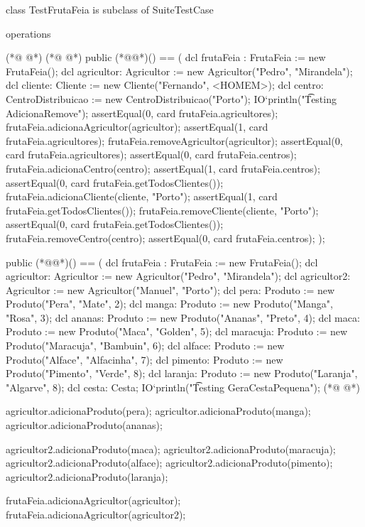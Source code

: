 \begin{vdmpp}[breaklines=true]
class TestFrutaFeia is subclass of SuiteTestCase

operations 

(*@
\label{testGeraCestaPequena:5}
@*)
(*@
\label{testAdicionaRemove:5}
@*)
public (*@@*)() == (
 dcl frutaFeia : FrutaFeia := new FrutaFeia(); 
 dcl agricultor: Agricultor := new Agricultor("Pedro", "Mirandela");
 dcl cliente: Cliente := new Cliente("Fernando", <HOMEM>);
 dcl centro: CentroDistribuicao := new CentroDistribuicao("Porto");
 IO`println("\t Testing AdicionaRemove");
 assertEqual(0, card frutaFeia.agricultores);  
 frutaFeia.adicionaAgricultor(agricultor);
 assertEqual(1, card frutaFeia.agricultores);
 frutaFeia.removeAgricultor(agricultor);
 assertEqual(0, card frutaFeia.agricultores);
 assertEqual(0, card frutaFeia.centros);
 frutaFeia.adicionaCentro(centro);
 assertEqual(1, card frutaFeia.centros);
 assertEqual(0, card frutaFeia.getTodosClientes());
 frutaFeia.adicionaCliente(cliente, "Porto");
 assertEqual(1, card frutaFeia.getTodosClientes());
 frutaFeia.removeCliente(cliente, "Porto");
 assertEqual(0, card frutaFeia.getTodosClientes());
 frutaFeia.removeCentro(centro);
 assertEqual(0, card frutaFeia.centros);
);

public (*@@*)() == (
 dcl frutaFeia : FrutaFeia := new FrutaFeia(); 
 dcl agricultor: Agricultor := new Agricultor("Pedro", "Mirandela"); 
 dcl agricultor2: Agricultor := new Agricultor("Manuel", "Porto"); 
 dcl pera: Produto := new Produto("Pera", "Mate", 2);
 dcl manga: Produto := new Produto("Manga", "Rosa", 3);
 dcl ananas: Produto := new Produto("Ananas", "Preto", 4);
 dcl maca: Produto := new Produto("Maca", "Golden", 5);
 dcl maracuja: Produto := new Produto("Maracuja", "Bambuin", 6);
  dcl alface: Produto := new Produto("Alface", "Alfacinha", 7);
  dcl pimento: Produto := new Produto("Pimento", "Verde", 8);
  dcl laranja: Produto := new Produto("Laranja", "Algarve", 8);
 dcl cesta: Cesta;
 IO`println("\t Testing GeraCestaPequena"); 
(*@
\label{testeGereTodasEncomendas:42}
@*)
 
 agricultor.adicionaProduto(pera);
 agricultor.adicionaProduto(manga);
 agricultor.adicionaProduto(ananas);
 
 agricultor2.adicionaProduto(maca);
 agricultor2.adicionaProduto(maracuja);
 agricultor2.adicionaProduto(alface);
 agricultor2.adicionaProduto(pimento);
 agricultor2.adicionaProduto(laranja);
 
 frutaFeia.adicionaAgricultor(agricultor);
 frutaFeia.adicionaAgricultor(agricultor2);
 

\end{vdmpp}
